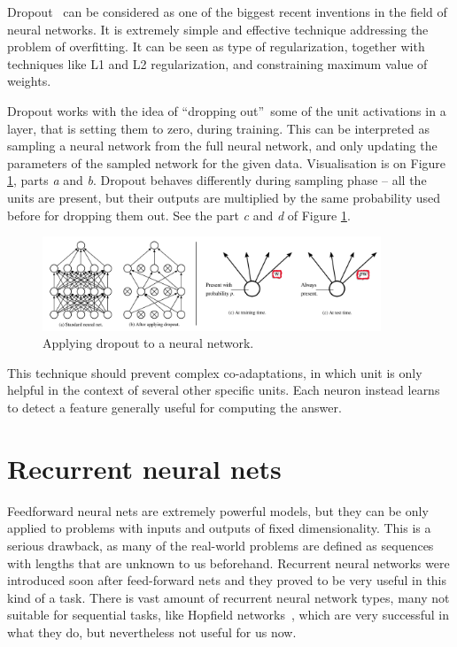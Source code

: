 Dropout~\cite{DBLP:journals/corr/abs-1207-0580, JMLR:v15:srivastava14a} can be considered as one of the biggest recent inventions in the field of neural networks. It is extremely simple and effective technique addressing the problem of overfitting. It can be seen as type of regularization, together with techniques like L1 and L2 regularization, and constraining maximum value of weights.

Dropout works with the idea of \textquotedblleft dropping out\textquotedblright\ some of the unit activations in a layer, that is setting them to zero, during training. This can be interpreted as sampling a neural network from the full neural network, and only updating the parameters of the sampled network for the given data. Visualisation is on Figure \ref{fig:dropout}, parts \emph{a} and \emph{b}. Dropout behaves differently during sampling phase -- all the units are present, but their outputs are multiplied by the same probability used before for dropping them out. See the part \emph{c} and \emph{d} of Figure \ref{fig:dropout}.

\begin{figure}[!t]
	\centering
	\includegraphics[width=0.9\textwidth]{fig/dropout.pdf}
	\caption{Applying dropout to a neural network. \cite{JMLR:v15:srivastava14a}
		\label{fig:dropout}}
\end{figure}

This technique should prevent complex co-adaptations, in which unit is only helpful in the context of several other specific units. Each neuron instead learns to detect a feature generally useful for computing the answer.

\section{Recurrent neural nets}

Feedforward neural nets are extremely powerful models, but they can be only applied to problems with inputs and outputs of fixed dimensionality. This is a serious drawback, as many of the real-world problems are defined as sequences with lengths that are unknown to us beforehand. Recurrent neural networks were introduced soon after feed-forward nets and they proved to be very useful in this kind of a task. There is vast amount of recurrent neural network types, many not suitable for sequential tasks, like Hopfield networks~\cite{hopfield1982neural}, which are very successful in what they do, but nevertheless not useful for us now.


